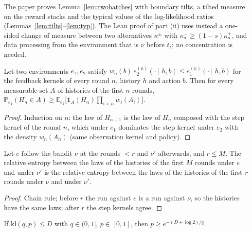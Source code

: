 \documentclass[11pt]{article}
\newcommand{\E}{\mathbb{E}}
\newcommand{\PP}{\mathbb{P}}
\begin{document}
The paper proves Lemma~\ref{lem:twobatches} with boundary tilts, a tilted measure on the reward
stacks and the typical values of the log-likelihood ratios (Lemmas~\ref{lem:tilts}--\ref{lem:typ}).
The Lean proof of part (ii) uses instead a one-sided change of measure between two alternatives
$\kappa^\pm$ with $\kappa^-_a\ge(1-s)\kappa^+_a$, and data processing from the environment that
is $\nu$ before $t_\ell$; no concentration is needed.

\begin{lemma}\label{flem:com-one-sided}
Let two environments $e_1,e_2$ satisfy $w_n(b)\,e_2^{(n)}(\cdot\mid h,b)\le e_1^{(n)}(\cdot\mid h,b)$
for the feedback kernels of every round $n$, history $h$ and action $b$. Then for every measurable
set $A$ of histories of the first $n$ rounds,
$\PP_{e_1}(H_n\in A)\ge\E_{e_2}\big[\mathbf 1_A(H_n)\prod_{i<n}w_i(A_i)\big]$.
\end{lemma}

\begin{proof}
Induction on $n$: the law of $H_{n+1}$ is the law of $H_n$ composed with the step kernel of the
round $n$, which under $e_1$ dominates the step kernel under $e_2$ with the density $w_n(A_n)$
(same observation kernel and policy).
\end{proof}

\begin{lemma}\label{flem:switch-kl-left}
Let $e$ follow the bandit $\nu$ at the rounds $<r$ and $\nu'$ afterwards, and $r\le M$. The relative
entropy between the laws of the histories of the first $M$ rounds under $e$ and under $\nu'$ is the
relative entropy between the laws of the histories of the first $r$ rounds under $\nu$ and
under $\nu'$.
\end{lemma}

\begin{proof}
Chain rule; before $r$ the run against $e$ is a run against $\nu$, so the histories have the same
laws; after $r$ the step kernels agree.
\end{proof}

\begin{lemma}\label{flem:dp}
\uses{}
If $\mathrm{kl}(q,p)\le D$ with $q\in(0,1]$, $p\in[0,1]$, then $p\ge e^{-(D+\log2)/q}$.
\end{lemma}
\end{document}
